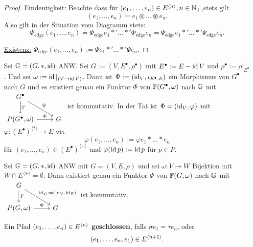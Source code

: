 \begin{proof}
    \underline{Eindeutigkeit:} Beachte dass für $(e_1,\ldots,e_n) \in E^{\langle n\rangle}, n \in \N_+$,stets gilt
    $$  (e_1,\ldots, e_n) = e_1 \circledast \ldots \circledast e_n.$$
    Also gilt in der Situation vom Diagramm stets:
    $$ \Phi_{\text{edge}}(e_1, \ldots, e_n) = \Phi_{\text{edge}}e_1 \ast' \ldots \ast' \Phi_{\text{edge}}e_n = \Psi_{\text{edge}}e_1 \ast' \ldots \ast' \Psi_{\text{edge}} e_n.$$

    \underline{Existenz:} $ \Phi_{\text{edge}}(e_1,\ldots,e_n) := \Psi e_1 \ast' \ldots \ast' \Psi e_n$.
\end{proof}

\begin{bemerkung}
    Sei $\G = (G, \ast, \id)$ ANW. Sei $G := (V, E^\bullet, \rho^\bullet)$ mit $E^\bullet := E - \id V$ und
    $\rho^\bullet := \rho|_{E^\bullet}$. Und sei $\omega := \id|_{(V \to \id V)}$. 
    Dann ist $\Psi:= (\id_V, i_{E^\bullet,E})$ ein 
    Morphismus von $G^\bullet$ nach $G$ und es existiert genau ein Funktor $\Phi$ von $\P(G^\bullet, \omega)$ nach $\G$ mit
    $\begin{tikzcd}
        G^\bullet \dar{\Gamma} \drar{\Psi}\\
        P(G^\bullet,\omega) \rar{\Phi} & G
    \end{tikzcd}$ ist kommutativ. 
    In der Tat ist $\Phi=(\id_V, \varphi)$ mit $\varphi:(E^\bullet)^{\langle\ast\rangle} \to E$
    via $$\varphi(e_1, \ldots, e_n) := \varphi e_1 \ast \ldots \ast e_n$$
    für $(e_1, \ldots, e_n) \in (E^\bullet)^{\langle +\rangle}$ und $\varphi(\id p):= \id p$ für $p \in P$.
\end{bemerkung}

\begin{bemerkung}
    Sei $\G = (G, \ast, \id)$ ANW mit $G=(V,E,\rho)$ und sei $\omega: V \to W$ Bijektion mit $W \cap E^{\langle + \rangle} = \emptyset$.
    Dann existiert genau ein Funktor $\Phi$ von $\P(G, \omega)$ nach $\G$ mit
    $\begin{tikzcd}
        G \dar{\Gamma} \drar{\id_G:=(\id_V, \id_E)}\\
        P(G,\omega) \rar{\Phi} & G
    \end{tikzcd}$ ist kommutativ.
\end{bemerkung}

\begin{definition}
    Ein Pfad $(e_1,\ldots,e_n) \in E^{\<n\>}$ \textbf{geschlossen}, falls $\sigma e_1 = \tau e_n$, oder
    $$ (e_1,\ldots,e_n, e_1) \in E^{\<n+1\>}.$$
\end{definition}

